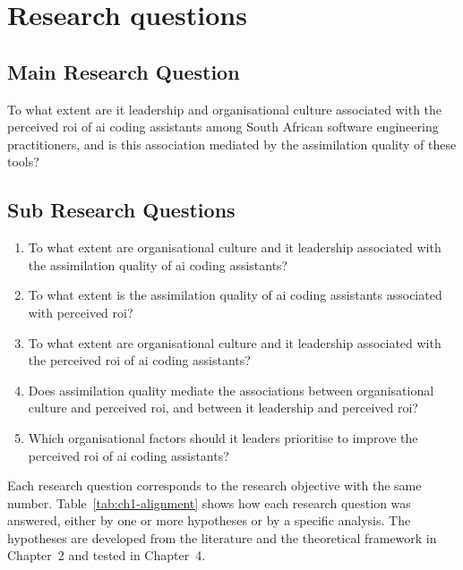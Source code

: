 \section{Research questions} 
\label{sec:Research questions} 
\subsection{Main Research Question}
\label{sec:Main Research Question}


To what extent are \gls{it} leadership and organisational culture associated with the perceived \gls{roi} of \gls{ai} coding assistants among South African software engineering practitioners, and is this association mediated by the assimilation quality of these tools?

\subsection{Sub Research Questions}
\label{sec:Sub Research Questions}

\begin{enumerate}
	\item[RQ1.] To what extent are organisational culture and \gls{it} leadership associated with the assimilation quality of \gls{ai} coding assistants?
	\item[RQ2.] To what extent is the assimilation quality of \gls{ai} coding assistants associated with perceived \gls{roi}?
	\item[RQ3.] To what extent are organisational culture and \gls{it} leadership associated with the perceived \gls{roi} of \gls{ai} coding assistants?
	\item[RQ4.] Does assimilation quality mediate the associations between organisational culture and perceived \gls{roi}, and between \gls{it} leadership and perceived \gls{roi}?
	\item[RQ5.] Which organisational factors should \gls{it} leaders prioritise to improve the perceived \gls{roi} of \gls{ai} coding assistants?
\end{enumerate}

Each research question corresponds to the research objective with the same number. Table~\ref{tab:ch1-alignment} shows how each research question was answered, either by one or more hypotheses or by a specific analysis. The hypotheses are developed from the literature and the theoretical framework in Chapter~2 and tested in Chapter~4.

